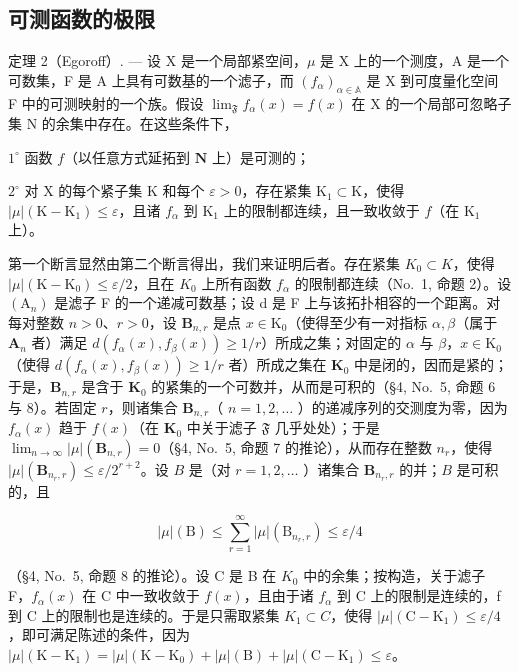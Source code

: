 \subsection{可测函数的极限}

定理 2（Egoroff）. --- 设 X 是一个局部紧空间，\(\mu\) 是 X 上的一个测度，A 是一个可数集，F 是 A 上具有可数基的一个滤子，而 \((f_{\alpha})_{\alpha\in\mathbb{A}}\) 是 X 到可度量化空间 F 中的可测映射的一个族。假设 \(\lim_{\mathfrak{F}} f_{\alpha}(x) = f(x)\) 在 X 的一个局部可忽略子集 N 的余集中存在。在这些条件下，

\(1^{\circ}\) 函数 \(f\)（以任意方式延拓到 \(\mathbf{N}\) 上）是可测的；

\(2^{\circ}\) 对 X 的每个紧子集 K 和每个 \(\varepsilon > 0\)，存在紧集 \(\mathrm{K}_{1} \subset \mathrm{K}\)，使得 \(|\mu| (\mathrm{K} - \mathrm{K}_{1}) \leqslant \varepsilon\)，且诸 \(f_{\alpha}\) 到 \(\mathrm{K}_{1}\) 上的限制都连续，且一致收敛于 \(f\)（在 \(\mathrm{K}_{1}\) 上）。

第一个断言显然由第二个断言得出，我们来证明后者。存在紧集 \(K_{0} \subset K\)，使得 \(|\mu|(\mathrm{K} - \mathrm{K}_{0}) \leqslant \varepsilon/2\)，且在 \(K_{0}\) 上所有函数 \(f_{\alpha}\) 的限制都连续（No.~1, 命题 2）。设 \((\mathrm{A}_{n})\) 是滤子 F 的一个递减可数基；设 d 是 F 上与该拓扑相容的一个距离。对每对整数 \(n > 0\)、\(r > 0\)，设 \(\mathbf{B}_{n,r}\) 是点 \(x \in \mathrm{K}_0\)（使得至少有一对指标 \(\alpha, \beta\)（属于 \(\mathbf{A}_n\) 者）满足 \(d(f_{\alpha}(x), f_{\beta}(x)) \geqslant 1 / r\)）所成之集；对固定的 \(\alpha\) 与 \(\beta\)，\(x \in \mathrm{K}_0\)（使得 \(d(f_{\alpha}(x), f_{\beta}(x)) \geqslant 1 / r\) 者）所成之集在 \(\mathbf{K}_0\) 中是闭的，因而是紧的；于是，\(\mathbf{B}_{n,r}\) 是含于 \(\mathbf{K}_0\) 的紧集的一个可数并，从而是可积的（§4, No.~5, 命题 6 与 8）。若固定 \(r\)，则诸集合 \(\mathbf{B}_{n,r}\)（ \(n = 1,2,\ldots\) ）的递减序列的交测度为零，因为 \(f_{\alpha}(x)\) 趋于 \(f(x)\)（在 \(\mathbf{K}_0\) 中关于滤子 \(\mathfrak{F}\) 几乎处处）；于是 \(\lim_{n \to \infty} |\mu|(\mathbf{B}_{n,r}) = 0\)（§4, No.~5, 命题 7 的推论），从而存在整数 \(n_r\)，使得 \(|\mu|(\mathbf{B}_{n_r,r}) \leqslant \varepsilon / 2^{r+2}\)。设 \(B\) 是（对 \(r = 1,2,\ldots\) ）诸集合 \(\mathbf{B}_{n_r,r}\) 的并；\(B\) 是可积的，且

\[
| \mu | (\mathrm{B}) \leqslant \sum_ {r = 1} ^ {\infty} | \mu | (\mathrm{B} _ {n _ {r}, r}) \leqslant \varepsilon / 4
\]

（§4, No.~5, 命题 8 的推论）。设 C 是 B 在 \(K_{0}\) 中的余集；按构造，关于滤子 F，\(f_{\alpha}(x)\) 在 C 中一致收敛于 \(f(x)\)，且由于诸 \(f_{\alpha}\) 到 C 上的限制是连续的，f 到 C 上的限制也是连续的。于是只需取紧集 \(K_{1} \subset C\)，使得 \(|\mu|(\mathrm{C} - \mathrm{K}_{1}) \leqslant \varepsilon/4\)，即可满足陈述的条件，因为 \(|\mu|(\mathrm{K} - \mathrm{K}_{1}) = |\mu|(\mathrm{K} - \mathrm{K}_{0}) + |\mu|(\mathrm{B}) + |\mu|(\mathrm{C} - \mathrm{K}_{1}) \leqslant \varepsilon\)。

